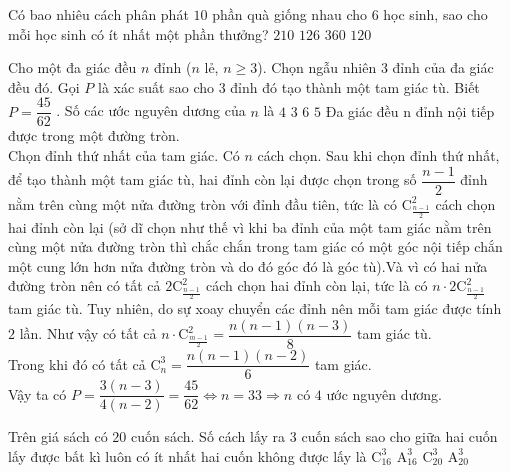 \begin{ex}%
	Có bao nhiêu cách phân phát $10$ phần quà giống nhau cho $6$ học sinh, sao cho mỗi học sinh có ít nhất một phần thưởng?
	\choice
	{$210$}
	{\True $126$}
	{$360$}
	{$120$}
\end{ex}%
\begin{ex}%
	Cho một đa giác đều $n$ đỉnh ($n$ lẻ, $n\geq 3$). Chọn ngẫu nhiên $3$ đỉnh của đa giác đều đó. Gọi $P$ là xác
suất sao cho $3$ đỉnh đó tạo thành một tam giác tù. Biết $P=\dfrac{45}{62}$
. Số các ước nguyên dương của $n$ là
	\choice
	{\True $4$}
	{$3$}
	{$6$}
	{$5$}
	\loigiai
	{Đa giác đều n đỉnh nội tiếp được trong một đường tròn.\\
Chọn đỉnh thứ nhất của tam giác. Có $n$ cách chọn. Sau khi chọn đỉnh thứ nhất, để tạo thành một tam giác
tù, hai đỉnh còn lại được chọn trong số
$\dfrac{n-1}{2}$
đỉnh nằm trên cùng một nửa đường tròn với đỉnh đầu tiên,
tức là có 
$  \mathrm{C}_{\tfrac{n - 1}{2}}^2$
cách chọn hai đỉnh còn lại (sở dĩ chọn như thế vì khi ba đỉnh của một tam giác nằm trên cùng một nửa đường tròn thì chắc chắn trong tam giác có một góc nội tiếp chắn một cung lớn hơn nửa
đường tròn và do đó góc đó là góc tù).Và vì có hai nửa đường tròn nên có tất cả 
	$ 2 \mathrm{C}_{\tfrac{n - 1}{2}}^2$	 cách chọn hai đỉnh còn lại, tức là có $ n \cdot 2 \mathrm{C}_{\tfrac{n - 1}{2}}^2$ tam giác tù. Tuy nhiên, do sự xoay chuyển các đỉnh nên mỗi tam giác được tính $2$ lần. Như vậy có tất cả
	 $ n\cdot  \mathrm{C}_{\tfrac{m - 1}{2}}^2=\dfrac{n(n - 1)(n - 3)}{8}$ tam giác tù.\\ 
	  Trong khi đó  có tất cả  $ \mathrm{C}_n^3=\dfrac{n(n - 1)(n - 2)}{6}$ tam giác.\\
	 Vậy ta có $ P =\dfrac{3(n - 3)}{4(n - 2)}=\dfrac{45}{62}\Leftrightarrow n = 33\Rightarrow n $ có $4$ ước nguyên dương.
	}
\end{ex}%
\begin{ex}%
	Trên giá sách có $20$ cuốn sách. Số cách lấy ra $3$ cuốn sách sao cho giữa hai cuốn lấy được bất kì luôn có ít nhất hai cuốn không được lấy là
	\choice
	{\True $\mathrm{C}_{16}^3$}
	{$\mathrm{A}_{16}^3$}
	{$\mathrm{C}_{20}^3$}
	{$\mathrm{A}_{20}^3$}
\end{ex}